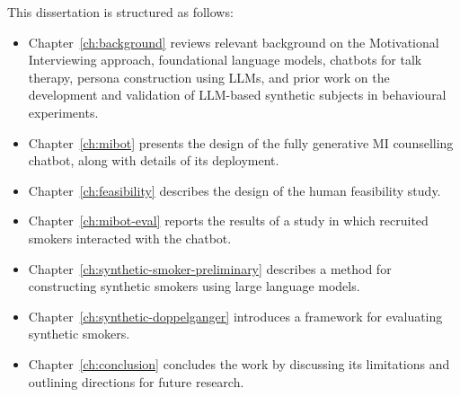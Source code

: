 This dissertation is structured as follows:
\begin{itemize}
    \item Chapter~\ref{ch:background} reviews relevant background on the Motivational Interviewing approach, foundational language models, chatbots for talk therapy, persona construction using LLMs, and prior work on the development and validation of LLM-based synthetic subjects in behavioural experiments.
    \item Chapter~\ref{ch:mibot} presents the design of the fully generative MI counselling chatbot, along with details of its deployment.
    \item Chapter~\ref{ch:feasibility} describes the design of the human feasibility study.
    \item Chapter~\ref{ch:mibot-eval} reports the results of a study in which recruited smokers interacted with the chatbot.
    \item Chapter~\ref{ch:synthetic-smoker-preliminary} describes a method for constructing synthetic smokers using large language models.
    \item Chapter~\ref{ch:synthetic-doppelganger} introduces a framework for evaluating synthetic smokers.
    \item Chapter~\ref{ch:conclusion} concludes the work by discussing its limitations and outlining directions for future research.
\end{itemize}
